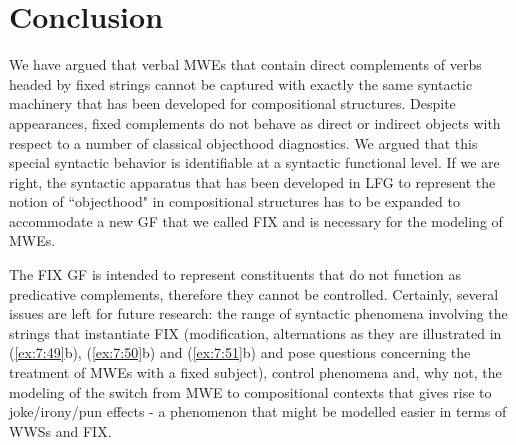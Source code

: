 \documentclass[output=paper]{langsci/langscibook}
\begin{document}
\section{Conclusion}
\label{conclusion}

We have argued that verbal MWEs that contain direct complements of verbs headed by fixed strings cannot be captured with exactly the same syntactic machinery that has been developed for compositional structures. Despite appearances, fixed complements do not behave as direct or indirect objects with respect to a number of classical objecthood diagnostics. We argued that this special syntactic behavior is identifiable at a syntactic functional level. If we are right, the syntactic apparatus that has been developed in LFG to represent the notion of ``objecthood" in compositional structures has to be expanded  to accommodate a new GF that we called FIX and is necessary for the modeling of MWEs.

The FIX GF is intended to represent constituents that do not function as predicative complements, therefore they cannot be controlled. Certainly, several issues are left for future research:  the range of syntactic phenomena involving the strings that instantiate FIX (modification, alternations as they are illustrated in (\ref{ex:7:49}b), (\ref{ex:7:50}b) and (\ref{ex:7:51}b) and pose questions concerning the treatment of  MWEs with a fixed subject), control phenomena and, why not, the modeling of the switch from  MWE to compositional contexts that gives rise to joke/irony/pun effects - a phenomenon that might be modelled easier in terms of WWSs and FIX. 

\printbibliography[heading=subbibliography,notkeyword=this]
\end{document}
